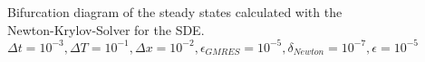 \documentclass[]{article}
\theoremstyle{definition}
\begin{document}
\begin{figure}
\caption{  Bifurcation diagram of the steady states calculated with the Newton-Krylov-Solver for the SDE. $\Delta t = 10^{-3}, \Delta T = 10^{-1}, \Delta x = 10^{-2}, \epsilon_{GMRES}=10^{-5},  \delta_{Newton} = 10^{-7}, \epsilon=10^{-5}$
}
\end{figure}

\end{document}
